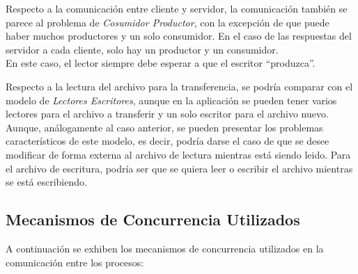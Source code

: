 \documentclass[a4paper,10pt]{article}
\begin{document}
	Respecto a la comunicaci\'on entre cliente y servidor, la comunicaci\'on tambi\'en se parece al problema de \emph
	{Cosumidor Productor},
	 con la
	 excepci\'on de que puede haber muchos productores y un solo consumidor. En el caso de las respuestas del servidor
	 a cada
	 cliente, solo hay un productor y un consumidor.\\
	En este caso, el lector siempre debe esperar a que el escritor ``produzca''.

	Respecto a la lectura del archivo para la transferencia, se podr\'ia comparar con el modelo de \emph{Lectores
	 Escritores}, aunque en la aplicaci\'on se pueden tener varios lectores para el archivo a transferir
	y un solo escritor para el archivo nuevo. \\Aunque, an\'alogamente 
	al caso anterior, se pueden presentar los problemas caracter\'isticos de este modelo, es decir, podr\'ia darse el caso
	de que se desee modificar de forma externa al archivo de lectura mientras est\'a siendo leido. Para el archivo de 
	escritura, 
	podr\'ia ser que se quiera leer o escribir el archivo mientras se est\'a escribiendo.

	\subsection{Mecanismos de Concurrencia Utilizados}
		A continuaci\'on se exhiben los mecanismos de concurrencia utilizados en la comunicaci\'on entre los procesos:
\end{document}

